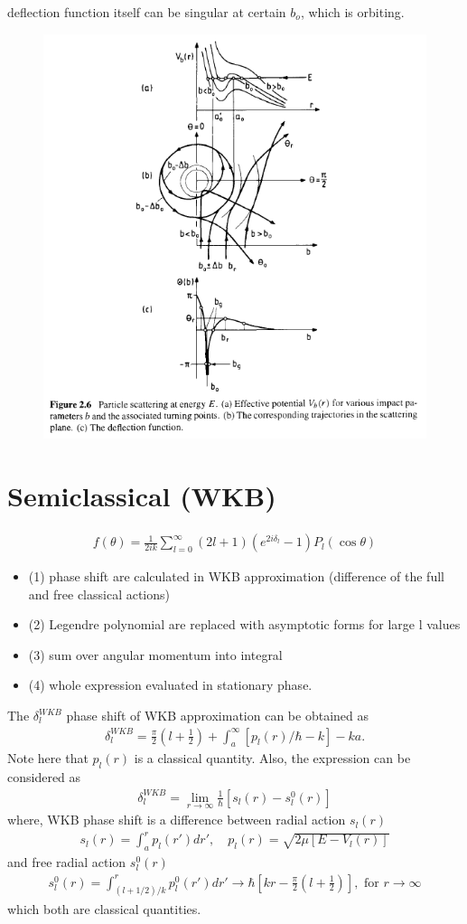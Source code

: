 \documentclass[10pt]{book}
\newcommand{\bea}{\begin{eqnarray}}
\newcommand{\eea}{\end{eqnarray}}
\begin{document}
deflection function itself can be singular at certain $b_{o}$, which is {\color{red} orbiting}. 

\begin{figure}
	\centering
	\includegraphics[width=0.7\linewidth]{figs/classical_trajectories}
	\caption{}
	\label{fig:classicaltrajectories}
\end{figure}

\section{Semiclassical (WKB)}
\bea 
f(\theta)=\frac{1}{2ik}\sum_{l=0}^\infty(2l+1)(e^{2i\delta_l}-1)P_l(\cos\theta)
\eea 

\begin{itemize}
	\item (1) phase shift are calculated in WKB approximation (difference of the full and free classical actions)
	\item (2) Legendre polynomial are replaced with asymptotic forms for large l values
	\item (3) sum over angular momentum into integral
	\item (4) whole expression evaluated in stationary phase. 
\end{itemize}

The $\delta_l^{WKB}$ phase shift of WKB approximation can be obtained as
\bea 
\delta_l^{WKB} = \frac{\pi}{2}(l+\frac{1}{2})+\int_a^\infty [p_l(r)/\hbar-k] - ka.  
\eea  
Note here that $p_l(r)$ is a classical quantity. Also, the expression can be 
considered as
\bea 
\delta_l^{WKB} = \lim_{r\to \infty}\frac{1}{\hbar}[s_l(r)-s_l^0(r)]
\eea 
where, WKB phase shift is a difference between radial action $s_l(r)$ 
\bea 
s_l(r) = \int_a^r p_l(r')dr',\quad p_l(r) =  \sqrt{2\mu[E-V_l(r)]}
\eea 
and free radial action $s^0_l(r)$
\bea 
s_l^0(r) = \int^r_{(l+1/2)/k} p_l^0(r')dr' \to \hbar[kr-\frac{\pi}{2}(l+\frac{1}{2})],\mbox{ for } r\to \infty 
\eea 
which both are classical quantities. 
\end{document}

